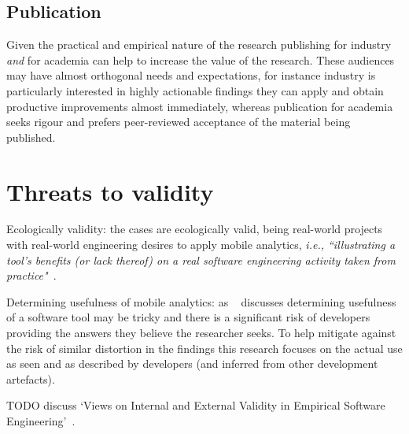 \subsection{Publication}
Given the practical and empirical nature of the research publishing for industry \emph{and} for academia can help to increase the value of the research. These audiences may have almost orthogonal needs and expectations, for instance industry is particularly interested in highly actionable findings they can apply and obtain productive improvements almost immediately, whereas publication for academia seeks rigour and prefers peer-reviewed acceptance of the material being published.


\hrulefill


\section{Threats to validity}

Ecologically validity: the cases are ecologically valid, being real-world projects with real-world engineering desires to apply mobile analytics, \emph{i.e., ``illustrating a tool’s benefits (or lack thereof) on a real software engineering activity taken from practice"}~\citep[p.126]{Ko2015_a_practical_guide_to_controlled_experiments_of_sw_eng_tools_with_human_participants}.

Determining usefulness of mobile analytics: as ~\citealt[pp.132-133]{Ko2015_a_practical_guide_to_controlled_experiments_of_sw_eng_tools_with_human_participants} discusses determining usefulness of a software tool may be tricky and there is a significant risk of developers providing the answers they believe the researcher seeks. To help mitigate against the risk of similar distortion in the findings this research focuses on the actual use as seen and as described by developers (and inferred from other development artefacts).

TODO discuss `Views on Internal and External Validity in Empirical Software Engineering'~\citep{sigmund2015_views_on_internal_and_external_validity_in_ESE}.
